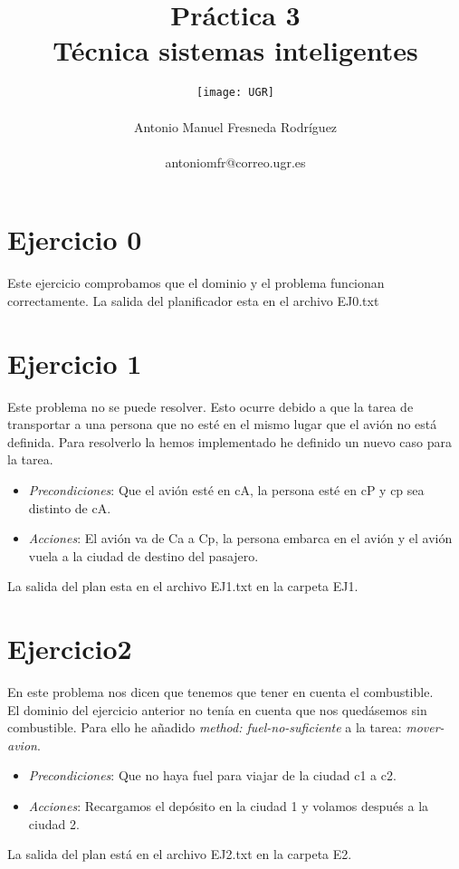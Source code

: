 \documentclass[10pt,spanish]{article}
\author{
	\texttt{[image: UGR]} \\\\
	\Large 	Antonio Manuel Fresneda Rodríguez\\
	\\antoniomfr@correo.ugr.es
	\\
}
\date{}
\title{\huge \textbf{Práctica 3\\ Técnica sistemas inteligentes}}
\begin{document}
	\maketitle
	\pagebreak
	\pagebreak
	\section*{Ejercicio 0}
	Este ejercicio comprobamos que el dominio y el problema funcionan correctamente. La salida del planificador esta en el archivo EJ0.txt
	\section*{Ejercicio 1}
	Este problema no se puede resolver. Esto ocurre debido a que la tarea de transportar a una persona que no esté en el mismo lugar que el avión no está definida.
	Para resolverlo la hemos implementado he definido un nuevo caso para la tarea.
	\begin{itemize}
		\item \textit {Precondiciones}: Que el avión esté en cA, la persona esté en cP y cp sea distinto de cA.
		\item \textit {Acciones}: El avión va de Ca a Cp, la persona embarca en el avión y el avión vuela a la ciudad de destino del pasajero.
	\end{itemize}
	La salida del plan esta en el archivo EJ1.txt en la carpeta EJ1.
	\section*{Ejercicio2}
	En este problema nos dicen que tenemos que tener en cuenta el combustible.\\
	El dominio del ejercicio anterior no tenía en cuenta que nos quedásemos sin combustible. Para ello he añadido \textit{method: fuel-no-suficiente} a la tarea: \textit{mover-avion}.\\
		\begin{itemize}
			\item \textit{Precondiciones}: Que no haya fuel para viajar de la ciudad c1 a c2.
			\item \textit{Acciones}: Recargamos el depósito en la ciudad 1 y volamos después a la ciudad 2.
		\end{itemize}
	La salida del plan está en el archivo EJ2.txt en la carpeta E2.
\end{document}
